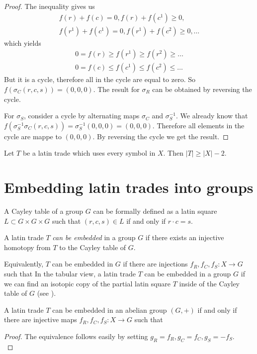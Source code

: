 \begin{proof}
The inequality gives us
\begin{align*}
	f(r) + f(c) = 0, f(r) + f(c^1) \geq 0, \\
	f(r^1) + f(c^1) = 0, f(r^1) + f(c^2) \geq 0, \dots 
\end{align*}
which yields
\begin{align*}
	0 = f(r) \geq f(r^1) \geq f(r^2) \geq \dots \\
	0 = f(c) \leq f(c^1) \leq f(c^2) \leq \dots
\end{align*}
But it is a cycle, therefore all in the cycle are equal to zero. So $f(\sigma_C(r,c,s)) = (0,0,0)$. The result for $\sigma_R$ can be obtained by reversing the cycle.

For $\sigma_S$, consider a cycle by alternating maps $\sigma_C$ and $\sigma_S^{-1}$. We already know that $f(\sigma_S^{-1}\sigma_C(r,c,s)) = \sigma_S^{-1}(0,0,0) = (0,0,0)$. Therefore all elements in the cycle are mappe to $(0,0,0)$. By reversing the cycle we get the result.

\end{proof}

\begin{cor}
Let $T$ be a latin trade which uses every symbol in $X$. Then $|T| \geq |X|-2$.
\end{cor}%


\section{Embedding latin trades into groups}

A Cayley table of a group $G$ can be formally defined as a latin square $L \subset G \times G \times G$ such that $(r,c,s) \in L$ if and only if $r \cdot c = s$.

\begin{defn}
A latin trade $T$ \emph{can be embedded} in a group $G$ if there exists an injective homotopy from $T$ to the Cayley table of $G$.
\end{defn}

Equivalently, $T$ can be embedded in $G$ if there are injections $f_R,f_C,f_S : X \rightarrow G$ such that
In the tabular view, a latin trade $T$ can be embedded in a group $G$ if we can find an isotopic copy of the partial latin square $T$ inside of the Cayley table of $G$ (see ).

\begin{lem}
\label{lem:abelian-embedding}
A latin trade $T$ can be embedded in an abelian group $(G,+)$ if and only if there are injective maps $f_R,f_C,f_S : X \rightarrow G$ such that
\end{lem}
\begin{proof}
The equivalence follows easily by setting $g_R = f_R, g_C = f_C, g_S = -f_S$. \\
\end{proof}

